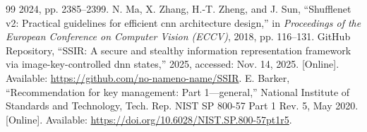 \begin{thebibliography}{99}
2024, pp. 2385--2399.
N. Ma, X. Zhang, H.-T. Zheng, and J. Sun,
``Shufflenet v2: Practical guidelines for efficient cnn architecture design,''
in \emph{Proceedings of the European Conference on Computer Vision (ECCV)},
2018, pp. 116--131.
GitHub Repository,
``SSIR: A secure and stealthy information representation framework via image-key-controlled dnn states,''
2025, accessed: Nov. 14, 2025. [Online]. Available:
\url{https://github.com/no-nameno-name/SSIR}.
E. Barker,
``Recommendation for key management: Part 1---general,''
National Institute of Standards and Technology,
Tech. Rep. NIST SP 800-57 Part 1 Rev. 5, May 2020. [Online]. Available:
\url{https://doi.org/10.6028/NIST.SP.800-57pt1r5}.
\end{thebibliography}
